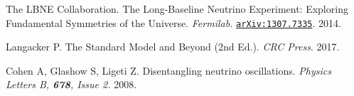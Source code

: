 \begin{thebibliography}{100}
	 The LBNE Collaboration. The Long-Baseline Neutrino Experiment:
		Exploring Fundamental Symmetries of the Universe.
		\textit{Fermilab.}
		\href{https://arxiv.org/abs/1307.7335}{\texttt{arXiv:1307.7335}}. 2014.

	 Langacker P. The Standard Model and Beyond (2nd Ed.).
		\textit{CRC Press}. 2017.

	 Cohen A, Glashow S, Ligeti Z. Disentangling neutrino
		oscillations. \textit{Physics Letters B, \textbf{678}, Issue 2.} 2008.

\end{thebibliography}
